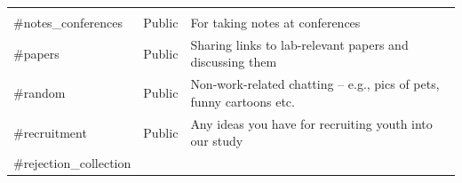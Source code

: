 \documentclass[]{book}
\begin{document}
\begin{longtable}[]{@{}lll@{}}
\begin{minipage}[t]{0.69\columnwidth}
\end{minipage}\tabularnewline
\begin{minipage}[t]{0.18\columnwidth}\raggedright\strut
\#notes\_conferences\strut
\end{minipage} & \begin{minipage}[t]{0.05\columnwidth}\raggedright\strut
Public\strut
\end{minipage} & \begin{minipage}[t]{0.69\columnwidth}\raggedright\strut
For taking notes at conferences\strut
\end{minipage}\tabularnewline
\begin{minipage}[t]{0.18\columnwidth}\raggedright\strut
\#papers\strut
\end{minipage} & \begin{minipage}[t]{0.05\columnwidth}\raggedright\strut
Public\strut
\end{minipage} & \begin{minipage}[t]{0.69\columnwidth}\raggedright\strut
Sharing links to lab-relevant papers and discussing them\strut
\end{minipage}\tabularnewline
\begin{minipage}[t]{0.18\columnwidth}\raggedright\strut
\#random\strut
\end{minipage} & \begin{minipage}[t]{0.05\columnwidth}\raggedright\strut
Public\strut
\end{minipage} & \begin{minipage}[t]{0.69\columnwidth}\raggedright\strut
Non-work-related chatting -- e.g., pics of pets, funny cartoons
etc.\strut
\end{minipage}\tabularnewline
\begin{minipage}[t]{0.18\columnwidth}\raggedright\strut
\#recruitment\strut
\end{minipage} & \begin{minipage}[t]{0.05\columnwidth}\raggedright\strut
Public\strut
\end{minipage} & \begin{minipage}[t]{0.69\columnwidth}\raggedright\strut
Any ideas you have for recruiting youth into our study\strut
\end{minipage}\tabularnewline
\begin{minipage}[t]{0.18\columnwidth}\raggedright\strut
\#rejection\_collection\strut
\end{minipage} & \begin{minipage}[t]{0.05\columnwidth}\raggedright\strut

\end{minipage}
\end{longtable}
\end{document}
